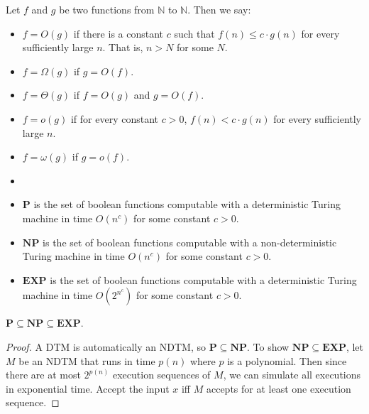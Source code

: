     \begin{defn} \label{def_bigo}
        Let $f$ and $g$ be two functions from $\mathbb{N}$ to $\mathbb{N}$. Then we say: \begin{itemize}
            \item $f=O(g)$ if there is a constant $c$ such that $f(n) \leq c \cdot g(n)$ for every sufficiently large $n$. That is, $n>N$ for some $N$.
            \item $f=\Omega(g)$ if $g=O(f)$.
            \item $f=\Theta(g)$ if $f=O(g)$ and $g=O(f)$.
            \item $f=o(g)$ if for every constant $c>0$, $f(n) < c \cdot g(n)$ for every sufficiently large $n$.
            \item $f=\omega(g)$ if $g=o(f)$.
        \end{itemize} 
    \end{defn}
        
    \begin{defn}[P, NP, EXP] \label{def_comp_p}
        \begin{itemize}
            \item []
            \item $\mathbf{P}$ is the set of boolean functions computable with a deterministic Turing machine in time $O(n^c)$ for some constant $c>0$.
            \item $\mathbf{NP}$ is the set of boolean functions computable with a non-deterministic Turing machine in time $O(n^c)$ for some constant $c>0$.
            \item $\mathbf{EXP}$ is the set of boolean functions computable with a deterministic Turing machine in time $O(2^{n^c})$ for some constant $c>0$.
        \end{itemize}
    \end{defn}
        
    \begin{thm} \label{thm_pnpexp}
        $\mathbf{P} \subseteq \mathbf{NP} \subseteq \mathbf{EXP}$.
    \end{thm}
        
    \begin{proof}
        A DTM is automatically an NDTM, so $\mathbf{P} \subseteq \mathbf{NP}$. To show $\mathbf{NP} \subseteq \mathbf{EXP}$, let $M$ be an NDTM that runs in time $p(n)$ where $p$ is a polynomial. Then since there are at most $2^{p(n)}$ execution sequences of $M$, we can simulate all executions in exponential time. Accept the input $x$ iff $M$ accepts for at least one execution sequence.
    \end{proof}
    
